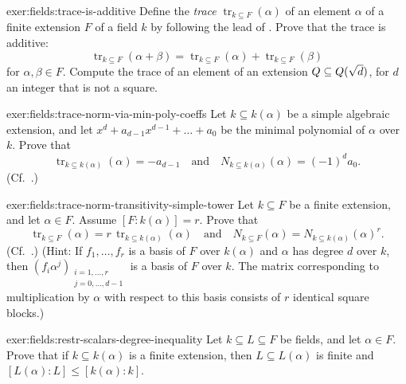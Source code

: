 \begin{exer}{}{exer:fields:trace-is-additive}
  Define the \emph{trace} $\operatorname{tr}_{k \subseteq F}(\alpha)$
  of an element $\alpha$ of a finite extension $F$ of a field $k$ by
  following the lead of
  . Prove that the trace is
  additive:
  \[
    \operatorname{tr}_{k \subseteq F}(\alpha + \beta) =
    \operatorname{tr}_{k \subseteq F}(\alpha) + \operatorname{tr}_{k
      \subseteq F}(\beta)
  \]
  for $\alpha, \beta \in F$. Compute the trace of an element of an
  extension $Q \subseteq Q(\sqrt{d})$, for $d$ an integer that is
  not a square.
\end{exer}

\begin{exer}{}{exer:fields:trace-norm-via-min-poly-coeffs}
  Let $k \subseteq k(\alpha)$ be a simple algebraic extension, and let
  $x^d + a_{d-1}x^{d-1} + \dots + a_0$ be the minimal polynomial of
  $\alpha$ over $k$. Prove that
  \[
    \operatorname{tr}_{k \subseteq k(\alpha)}(\alpha) = -a_{d-1}
    \quad\text{and}\quad N_{k \subseteq k(\alpha)}(\alpha) = {(-1)}^d
    a_0.
  \]
  (Cf.\ .)
\end{exer}

\begin{exer}{}{exer:fields:trace-norm-transitivity-simple-tower}
  Let $k \subseteq F$ be a finite extension, and let $\alpha \in
  F$. Assume $[F : k(\alpha)] = r$. Prove that
  \[
    \operatorname{tr}_{k \subseteq F}(\alpha) =
    r\,\operatorname{tr}_{k \subseteq k(\alpha)}(\alpha)
    \quad\text{and}\quad N_{k \subseteq F}(\alpha) = N_{k \subseteq
      k(\alpha)}{(\alpha)}^r.
  \]
  (Cf.\ .)
  (Hint: If $f_1, \dots, f_r$ is a
  basis of $F$ over $k(\alpha)$ and $\alpha$ has degree $d$ over $k$,
  then
  ${(f_i \alpha^j)}_{\substack{i = 1, \dots, r \\ j = 0, \dots, d-1}}$
  is a basis of $F$ over $k$. The matrix corresponding to
  multiplication by $\alpha$ with respect to this basis consists of
  $r$ identical square blocks.)
\end{exer}

\begin{exer}{}{exer:fields:restr-scalars-degree-inequality}
  Let $k \subseteq L \subseteq F$ be fields, and let $\alpha \in
  F$. Prove that if $k \subseteq k(\alpha)$ is a finite extension, then
  $L \subseteq L(\alpha)$ is finite and
  $[L(\alpha) : L] \leq [k(\alpha) : k]$.
\end{exer}


